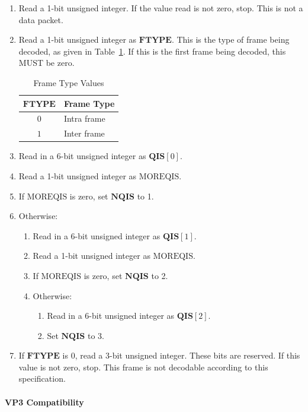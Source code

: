 \documentclass[9pt,letterpaper]{book}
\newcommand{\bitvar}[1]{\ensuremath{\mathbf{\bm{#1}}}}
\newcommand{\locvar}[1]{\ensuremath{\mathrm{#1}}}
\numberwithin{equation}{chapter}
\numberwithin{figure}{chapter}
\numberwithin{table}{chapter}
\begin{document}
\begin{enumerate}
\item
Read a 1-bit unsigned integer.
If the value read is not zero, stop.
This is not a data packet.
\item
Read a 1-bit unsigned integer as \bitvar{FTYPE}.
This is the type of frame being decoded, as given in
 Table~\ref{tab:frame-type}.
If this is the first frame being decoded, this MUST be zero.

\begin{table}[htbp]
\begin{center}
\begin{tabular}{cl}\toprule
\bitvar{FTYPE} & Frame Type  \\\midrule
$0$            & Intra frame \\
$1$            & Inter frame \\
\bottomrule\end{tabular}
\end{center}
\caption{Frame Type Values}
\label{tab:frame-type}
\end{table}

\item
Read in a 6-bit unsigned integer as $\bitvar{QIS}[0]$.
\item
Read a 1-bit unsigned integer as \locvar{MOREQIS}.
\item
If \locvar{MOREQIS} is zero, set \bitvar{NQIS} to 1.
\item
Otherwise:
\begin{enumerate}
\item
Read in a 6-bit unsigned integer as $\bitvar{QIS}[1]$.
\item
Read a 1-bit unsigned integer as \locvar{MOREQIS}.
\item
If \locvar{MOREQIS} is zero, set \bitvar{NQIS} to 2.
\item
Otherwise:
\begin{enumerate}
\item
Read in a 6-bit unsigned integer as $\bitvar{QIS}[2]$.
\item
Set \bitvar{NQIS} to 3.
\end{enumerate}
\end{enumerate}
\item
If \bitvar{FTYPE} is 0, read a 3-bit unsigned integer.
These bits are reserved.
If this value is not zero, stop.
This frame is not decodable according to this specification.
\end{enumerate}

\paragraph{VP3 Compatibility}
\end{document}
